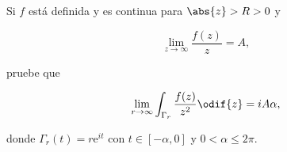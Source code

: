 \documentclass[../main.tex]{subfiles}
\begin{document}
\begin{problema}
    Si \(f\) está definida y es continua para \(\abs{z} > R > 0\) y

    \begin{equation*}
        \lim_{z \to \infty} \dfrac{f(z)}{z} = A,
    \end{equation*}

    pruebe que

    \begin{equation*}
        \lim_{r \to \infty} \int_{\Gamma_{r}}^{}\dfrac{f(z)}{z^{2}}\odif{z} = iA\alpha,
    \end{equation*}

    donde \(\Gamma_{r}(t) = r \mathrm{e}^{it}\) con \( t\in [-\alpha, 0]\) y
    \(0 < \alpha
    \leq 2\pi\).
\end{problema}
\end{document}
